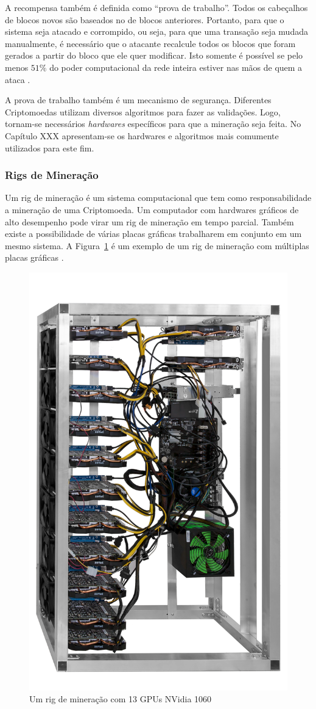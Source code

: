 \documentclass[
article,			%
12pt,				%
openright,			%
oneside,			%
a4paper,			%
chapter=TITLE,		%
section=TITLE,		%
subsection=TITLE,	%
subsubsection=TITLE,%
subsubsubsection=TITLE, %
english,			%
brazil,				%
]{abntex2}
\begin{document}
A recompensa também é definida como ``prova de trabalho''. Todos os
cabeçalhos de blocos novos são baseados no de blocos anteriores.
Portanto, para que o sistema seja atacado e corrompido, ou seja, para
que uma transação seja mudada manualmente, é necessário que o atacante
recalcule todos os blocos que foram gerados a partir do bloco que ele
quer modificar. Isto somente é possível se pelo menos $51\%$ do poder
computacional da rede inteira estiver nas mãos de quem a ataca
\cite{Nakamoto2008, Dev2014}.

A prova de trabalho também é um mecanismo de segurança. Diferentes
Criptomoedas utilizam diversos algoritmos para fazer as validações.
Logo, tornam-se necessários \emph{hardwares} específicos para que a
mineração seja feita. No Capítulo XXX apresentam-se os hardwares e
algoritmos mais comumente utilizados para este fim.


\subsubsection{Rigs de Mineração}

Um rig de mineração é um sistema computacional que tem como
responsabilidade a mineração de uma Criptomoeda. Um computador com
hardwares gráficos de alto desempenho pode virar um rig de mineração
em tempo parcial. Também existe a possibilidade de várias placas
gráficas trabalharem em conjunto em um mesmo sistema. A
Figura~\ref{fig:rig_mineracao} é um exemplo de um rig de mineração com
múltiplas placas gráficas \cite{BitcoinWiki2015}.

\begin{figure}[!htbp]
    \caption{\label{fig:rig_mineracao}Um rig de mineração com 13 GPUs
    NVidia 1060}
    \begin{center}
        \includegraphics[width=.3\linewidth]{rig_mineracao.png}
    \end{center}
\end{figure}
\end{document}
